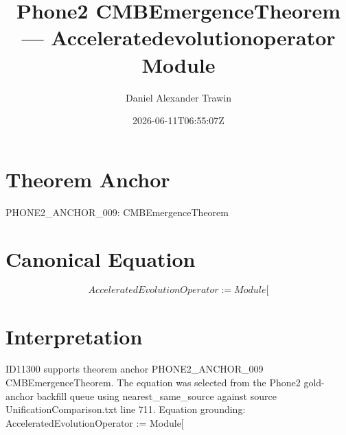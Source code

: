 \documentclass[11pt]{article}
\title{Phone2 CMBEmergenceTheorem — Acceleratedevolutionoperator Module}
\author{Daniel Alexander Trawin}
\date{2026-06-11T06:55:07Z}
\begin{document}
\maketitle
\section*{Theorem Anchor}
PHONE2_ANCHOR_009: CMBEmergenceTheorem
\section*{Canonical Equation}
\[
AcceleratedEvolutionOperator := Module[
\]
\section*{Interpretation}
ID11300 supports theorem anchor PHONE2_ANCHOR_009 CMBEmergenceTheorem. The equation was selected from the Phone2 gold-anchor backfill queue using nearest_same_source against source UnificationComparison.txt line 711. Equation grounding: AcceleratedEvolutionOperator := Module[
\end{document}

